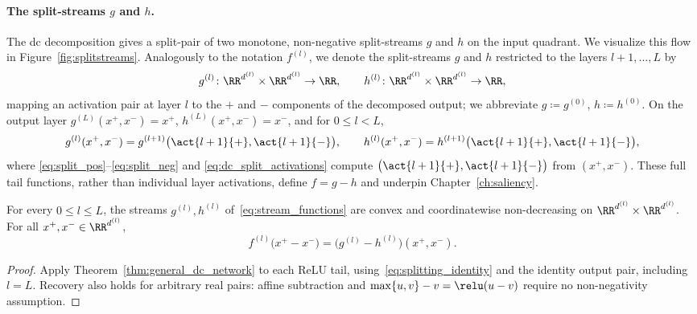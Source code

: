 \paragraph{The split-streams $g$ and $h$.}
The \ac{dc} decomposition gives a split-pair of two monotone, non-negative split-streams $g$ and $h$ on the input quadrant. We visualize this flow in Figure~\ref{fig:splitstreams}. Analogously to the notation $f^{(l)}$, we denote the split-streams $g$ and $h$ restricted to the layers $l+1,\dots,L$ by
\begin{equation}
	g^{(l)} \colon \RR^{d^{(l)}} \times \RR^{d^{(l)}} \to \RR,
	\qquad
	h^{(l)} \colon \RR^{d^{(l)}} \times \RR^{d^{(l)}} \to \RR,
	\label{eq:stream_functions}
\end{equation}
mapping an activation pair at layer $l$ to the $+$ and $-$ components of the decomposed output; we abbreviate $g \coloneqq g^{(0)}$, $h \coloneqq h^{(0)}$. On the output layer $g^{(L)}(x^+, x^-) = x^+$, $h^{(L)}(x^+, x^-) = x^-$, and for $0 \le l < L$,
\begin{equation}
	g^{(l)}(x^+, x^-) = g^{(l+1)}\bigl(\act{l+1}{+}, \act{l+1}{-}\bigr),
	\qquad
	h^{(l)}(x^+, x^-) = h^{(l+1)}\bigl(\act{l+1}{+}, \act{l+1}{-}\bigr),
	\label{eq:stream_recursion}
\end{equation}
where \eqref{eq:split_pos}--\eqref{eq:split_neg} and \eqref{eq:dc_split_activations} compute $\bigl(\act{l+1}{+}, \act{l+1}{-}\bigr)$ from $(x^+,x^-)$. These full tail functions, rather than individual layer activations, define $f=g-h$ and underpin Chapter~\ref{ch:saliency}.

\begin{theoremenv}\label{thm:split_correct}
For every $0\le l\le L$, the streams $g^{(l)},h^{(l)}$ of~\eqref{eq:stream_functions} are convex and coordinatewise non-decreasing on $\RR^{d^{(l)}}\times\RR^{d^{(l)}}$. For all $x^+,x^-\in\RR^{d^{(l)}}$,
\begin{equation}
	f^{(l)}\bigl(x^+-x^-\bigr)=\bigl(g^{(l)}-h^{(l)}\bigr)(x^+,x^-).
	\label{eq:split_correctness}
\end{equation}
\end{theoremenv}
\begin{proof}
Apply Theorem~\ref{thm:general_dc_network} to each ReLU tail, using~\eqref{eq:splitting_identity} and the identity output pair, including $l=L$. Recovery also holds for arbitrary real pairs: affine subtraction and $\max\{u,v\}-v=\relu(u-v)$ require no non-negativity assumption.
\end{proof}


